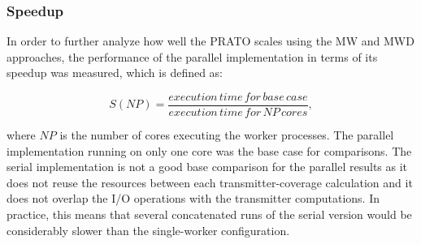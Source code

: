 \subsubsection{Speedup}

In order to further analyze how well the PRATO scales using the MW
and MWD approaches, the performance of the parallel implementation
in terms of its speedup was measured, which is defined as:

\begin{equation}
S(NP)=\frac{execution\, time\, for\, base\, case}{execution\, time\, for\, NP\, cores},\label{eq:04-Speedup}
\end{equation}


\noindent where $NP$ is the number of cores executing the worker
processes. The parallel implementation running on only one core was
the base case for comparisons. The serial implementation is not a
good base comparison for the parallel results as it does not reuse
the resources between each transmitter-coverage calculation and it
does not overlap the I/O operations with the transmitter computations.
In practice, this means that several concatenated runs of the serial
version would be considerably slower than the single-worker configuration.


